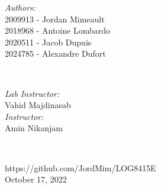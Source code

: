 \begin{titlepage}
    \begin{minipage}{0.4\textwidth}
    \begin{flushleft} \large
    \emph{Authors:}\\
    2009913 - Jordan Mimeault\\
    2018968 - Antoine Lombardo\\
    2020511 - Jacob Dupuis\\
    2024785 - Alexandre Dufort\\[1.2em]
    \end{flushleft}
    \end{minipage}
    ~
    \begin{minipage}{0.4\textwidth}
    \begin{flushright} \large
    \emph{Lab Instructor:} \\
    Vahid Majdinasab  \\[1.2em] %
    \emph{Instructor:} \\
    Amin Nikanjam %
    \end{flushright}
    \end{minipage}\\[2cm]
    \makeatother
    
    
    {\large https://github.com/JordMim/LOG8415E}\\[2cm]
    
    
    {\large October 17, 2022}\\[2cm] %
    
    \vfill %
    
    \end{titlepage}